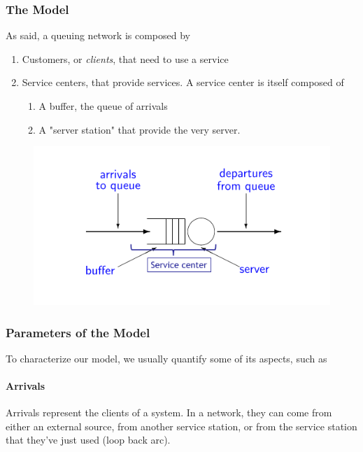 \documentclass[10pt,a4paper]{article}
\begin{document}
				\subsubsection{The Model}
					As said, a queuing network is composed by
					\begin{enumerate}
						\item Customers, or \emph{clients}, that need to use a service
						\item Service centers, that provide services. A service center is itself composed of
							\begin{enumerate}
								\item A buffer, the queue of arrivals
								\item A "server station" that provide the very server.
							\end{enumerate}
					\end{enumerate}
					\begin{figure}[H]
						\centering
						\includegraphics[width = \textwidth]{./images/queuingNetworks.png}
					\end{figure}
					
				\subsubsection{Parameters of the Model}
					To characterize our model, we usually quantify some of its aspects, such as
					
					\paragraph{Arrivals}
						Arrivals represent the clients of a system. In a network, they can come from either an external source, from another service station, or from the service station that they've just used (loop back arc).
						
\end{document}
